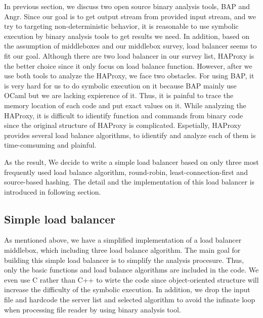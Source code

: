 In previous section, we discuss two open source binary analysis tools, BAP and
Angr.  Since our goal is to get output stream from provided input stream, and we
try to targeting non-deterministic behavior, it is reasonable to use symbolic
execution by binary analysis tools to get results we need.  In addition, based
on the assumption of middleboxes and our middlebox survey, load balancer seems
to fit our goal.  Although there are two load balancer in our survey list,
HAProxy is the better choice since it only focus on load balance function.
However, after we use both tools to analyze the HAProxy, we face two obstacles.
\ci For using BAP, it is very hard for us to do symbolic execution on it because
BAP mainly use OCaml but we are lacking expierence of it.  Thus, it is painful
to trace the memory location of each code and put exact values on it.  \cii
While analyzing the HAProxy, it is difficult to idientify function and commands
from binary code since the original structure of HAProxy is complicated.
Espetially, HAProxy provides several load balance algorithms, to idientify and
analyze each of them is time-comsuming and plainful.

As the result, We decide to write a simple load balancer based on only three
most frequently used load balance algorithm, \ca round-robin, \cb
least-connection-first and \cc source-based hashing.  The detail and the
implementation of this load balancer is introduced in following section.

\subsection{Simple load balancer}

As mentioned above, we have a simplified implementation of a load balancer
middlebox, which including three load balance algorithm.  The main goal for
building this simple load balancer is to simplify the analysis procesure.  Thus,
only the basic functions and load balance algorithms are included in the code.
We even use C rather than C++ to wirte the code since object-oriented structure
will increase the difficulty of the symbolic execution.  In addition, we drop
the input file and hardcode the server list and selected algorithm to avoid the
infinate loop when processing file reader by using binary analysis tool.

